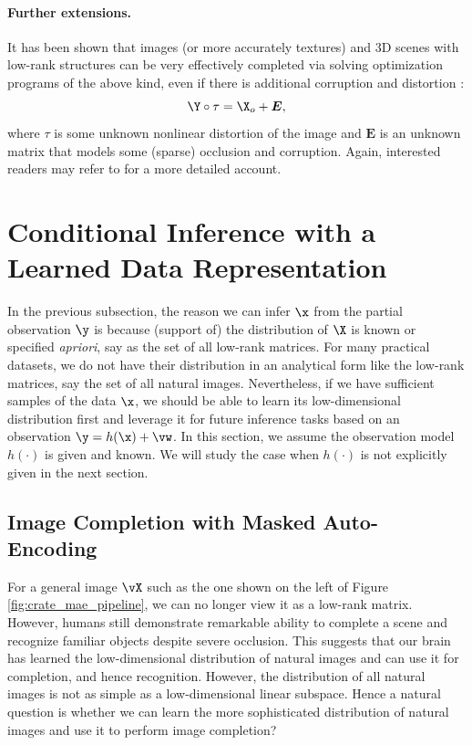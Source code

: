 \documentclass[../../book-main.tex]{subfiles}
\begin{document}
\paragraph{Further extensions.}
It has been shown that images (or more accurately textures) and 3D scenes
with low-rank structures can be very effectively completed via
solving optimization programs of the above kind, even if there is
additional corruption and distortion
\cite{Zhang2010TILTTI,Liang-ECCV2012,Yi_2023_ICCV}:
\begin{equation}
    \Y \circ \tau = \X_o + \boldsymbol{E},
\end{equation}
where $\tau$ is some unknown nonlinear distortion of the image and $\boldsymbol{E}$ is an unknown matrix that models some (sparse) occlusion and corruption. Again, interested readers may refer to \cite{Wright-Ma-2022} for a more detailed account.

\section{Conditional Inference with a Learned Data Representation}
In the previous subsection, the reason we can infer $\x$ from the partial observation $\y$ is because (support of) the distribution of $\X$ is known or specified {\em apriori}, say as the set of all low-rank matrices. For many practical datasets, we do not have their distribution in an analytical form like the low-rank matrices, say the set of all natural images. Nevertheless, if we have sufficient samples of the data $\x$, we should be able to learn its low-dimensional distribution first and leverage it for future inference tasks based on an observation $\y = h(\x) + \vw$. In this section, we assume the observation model $h(\cdot)$ is given and known. We will study the case when $h(\cdot)$ is not explicitly given in the next section.


\subsection{Image Completion with Masked Auto-Encoding}
For a general image $\vX$ such as the one shown on the left of Figure
\ref{fig:crate_mae_pipeline}, we can no longer view it as a low-rank
matrix. However, humans still demonstrate remarkable ability to
complete a scene and recognize familiar objects despite severe
occlusion. This suggests that our brain has learned the
low-dimensional distribution of natural images and can use it for
completion, and hence recognition. However, the distribution of all
natural images is not as simple as a low-dimensional linear subspace.
Hence a natural question is whether we can learn the more
sophisticated distribution of natural images and use it to perform
image completion?
\end{document}
